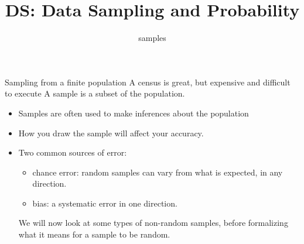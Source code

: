 \documentclass[aspectratio=169]{../latex_main/tntbeamer}  %
\title[Introduction]{DS: Data Sampling and Probability}
\subtitle{samples}
\begin{document}
	
	\maketitle
	
	\begin{frame}{Sampling from a finite population}
	    A census is great, but expensive and difficult to execute
	    \bigskip
	    A sample is a subset of the population.
        \begin{itemize}
            \item Samples are often used to make inferences about the population
            \item How you draw the sample will affect your accuracy.
            \item Two common sources of error:
            \begin{itemize}
                \item chance error: random samples can vary from what is expected, in any direction.
                \item bias: a systematic error in one direction.
            \end{itemize}
               \bigskip
               \bigskip
               We will now look at some types of non-random samples, before formalizing what it means for a sample to be random.

        \end{itemize}
	    
	\end{frame}
	
\end{document}
